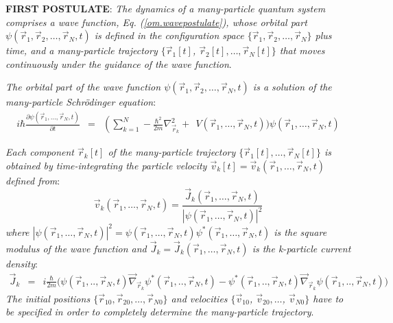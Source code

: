 \documentclass[onecolumn,nofootinbib, secnumarabic, amsmath, nobibnotes,11pt,aps,pra]{revtex4-1}
\newcommand{\eref}[1]{Eq. (\ref{#1})}
\begin{document}
\noindent\textbf{FIRST POSTULATE}: \textit{The dynamics of a many-particle quantum  system comprises a wave function,
\eref{om.wavepostulate}, whose orbital  part $\psi(\vec r_1,\vec r_2,\ldots,\vec r_N,t)$ is defined in the configuration space 
$\{\vec r_1,\vec r_2,\ldots,\vec r_N\}$ plus time, and a many-particle trajectory $\{\vec r_1[t]$, $\vec r_2[t],\ldots,\vec r_N[t]\}$ that moves continuously under the guidance of the wave function}.

\textit{The orbital part of the wave function $\psi(\vec r_1,\vec r_2,\ldots,\vec r_N,t)$ is a solution of the many-particle Schr\"odinger equation}:
\begin{eqnarray*}
i \hbar \frac{\partial \psi(\vec r_{1},\ldots,\vec
r_{N},t)}{\partial t} &=& \left( \sum_{k = 1}^N -\frac{\hbar^2}{2m}
\nabla^2_{\vec r_k} \right.+\ \ V(\vec r_{1},\ldots,\vec r_{N},t) \Bigg)
\psi(\vec r_{1},\ldots,\vec r_{N},t)
\end{eqnarray*}

\textit{Each component $\vec r_k[t]$ of the many-particle trajectory  $\{\vec r_1[t],\ldots,\vec r_N[t]\}$ is obtained by time-integrating the particle velocity $\vec v_k[t] = \vec v_k(\vec r_1,\ldots,\vec r_N,t)$ defined from}:
\begin{equation}
\vec v_k(\vec r_1,\ldots,\vec r_N,t) = \frac{\vec J_k(\vec r_1,\ldots,\vec r_N,t)} {|\psi(\vec r_1,\ldots,\vec r_N,t)|^2}
\nonumber
\end{equation}
\textit{where $|\psi(\vec r_1,\ldots,\vec r_N,t)|^2 = \psi(\vec
r_1,\ldots,\vec r_N,t) \psi^*(\vec r_1,\ldots,\vec r_N,t)$ is the
square modulus of the wave function and $\vec J_k = \vec J_k(\vec
r_1,\ldots,\vec r_N,t)$ is the k-particle  current density}:
\begin{eqnarray*}
\vec J_k &=& i \frac {\hbar} {2m} \Big(\psi(\vec r_1,..,\vec r_N,t) \vec \nabla_{\vec{r}_k} {\psi^{*}(\vec r_1,..,\vec r_N,t)}-\psi^{*}(\vec r_1,..,\vec r_N,t) \vec \nabla_{\vec{r}_k} \psi(\vec r_1,..,\vec r_N,t) \Big)
\end{eqnarray*}
\textit{The initial positions $\{\vec r_{10},\vec r_{20},\ldots,\vec r_{N0}\}$ and
velocities $\{\vec v_{10}$, $\vec v_{20},\ldots$, $\vec v_{N0}\}$ have to be specified in order to completely determine the many-particle trajectory}.\\
\end{document}
